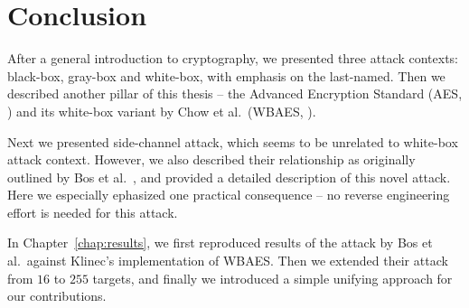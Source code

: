 \cleardoublepage{}

\chapter*{Conclusion}
\label{chap:concl}

After a general introduction to cryptography, we presented three attack contexts: black-box, gray-box and white-box, with emphasis on the last-named. Then we described another pillar of this thesis -- the Advanced Encryption Standard (AES, \cite{fips2001aes}) and its white-box variant by Chow et al.\ (WBAES, \cite{chow2002aes}).

Next we presented side-channel attack, which seems to be unrelated to white-box attack context. However, we also described their relationship as originally outlined by Bos et al.\ \cite{bos2015differential}, and provided a detailed description of this novel attack. Here we especially ephasized one practical consequence -- no reverse engineering effort is needed for this attack.

In Chapter~\ref{chap:results}, we first reproduced results of the attack by Bos et al.\ against Klinec's implementation \cite{klinec2013implementation} of WBAES. Then we extended their attack from $16$ to $255$ targets, and finally we introduced a simple unifying approach for our contributions.

